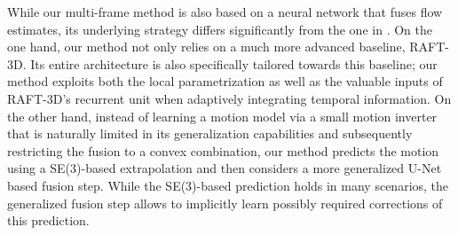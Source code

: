 \documentclass[10pt,twocolumn,letterpaper]{article}
\begin{document}
While our multi-frame method is also based on a neural network that fuses flow
estimates,
its underlying strategy differs significantly 
from the one in
\cite{Schuster2021_DTF}.
On the one hand, our method not only relies on a much more advanced baseline, \ie RAFT-3D. Its entire architecture is also specifically tailored towards this baseline; \eg our method exploits both the local  parametrization as well as the valuable inputs of RAFT-3D's recurrent unit when adaptively integrating temporal information.
On the other hand, instead of learning a motion model via a small motion inverter that is naturally limited in its generalization capabilities and subsequently restricting the fusion to a convex combination, our method predicts the motion using a SE(3)-based extrapolation and then considers a more generalized U-Net based fusion step. 
While the SE(3)-based prediction holds in many scenarios, the generalized fusion step allows to implicitly learn possibly required corrections of this prediction. 
\end{document}

